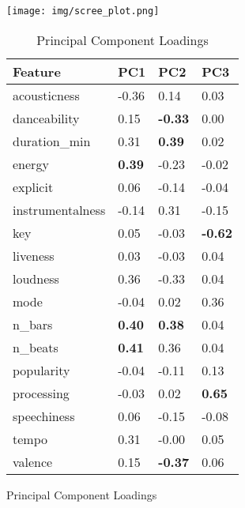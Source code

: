 \begin{figure}[H]
    \begin{minipage}{0.5\textwidth}
        \centering
        \texttt{[image: img/scree\_plot.png]}
        \caption{The scree plot shows how much each principal component contributes to the total variance of the data.}
    \end{minipage}
    \hfill
    \begin{minipage}{0.5\textwidth}
        \begin{table}[H]
            \tiny
                \centering
            \begin{tabular}{|l|l|l|l|}
                \hline
                \textbf{Feature} & \textbf{PC1} & \textbf{PC2} & \textbf{PC3} \\
                \hline
acousticness & -0.36 & 0.14 & 0.03 \\
danceability & 0.15 & \textbf{-0.33} & 0.00 \\
duration\_min & 0.31 & \textbf{0.39} & 0.02 \\
energy & \textbf{0.39} & -0.23 & -0.02 \\
explicit & 0.06 & -0.14 & -0.04 \\
instrumentalness & -0.14 & 0.31 & -0.15 \\
key & 0.05 & -0.03 & \textbf{-0.62} \\
liveness & 0.03 & -0.03 & 0.04 \\
loudness & 0.36 & -0.33 & 0.04 \\
mode & -0.04 & 0.02 & 0.36 \\
n\_bars & \textbf{0.40} & \textbf{0.38} & 0.04 \\
n\_beats & \textbf{0.41} & 0.36 & 0.04 \\
popularity & -0.04 & -0.11 & 0.13 \\
processing & -0.03 & 0.02 & \textbf{0.65} \\
speechiness & 0.06 & -0.15 & -0.08 \\
tempo & 0.31 & -0.00& 0.05 \\
valence& 0.15& \textbf{-0.37}& 0.06\\
                \hline
            \end{tabular}
            \caption{Principal Component Loadings}
        \end{table}
    \end{minipage}
\end{figure}
